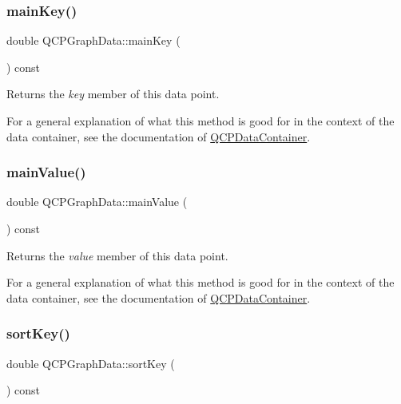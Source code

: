 \subsubsection{\texorpdfstring{main\+Key()}{mainKey()}}
{\footnotesize\ttfamily double Q\+C\+P\+Graph\+Data\+::main\+Key (\begin{DoxyParamCaption}{ }\end{DoxyParamCaption}) const\hspace{0.3cm}{\ttfamily [inline]}}

Returns the {\itshape key} member of this data point.

For a general explanation of what this method is good for in the context of the data container, see the documentation of \hyperlink{class_q_c_p_data_container}{Q\+C\+P\+Data\+Container}. \mbox{\label{class_q_c_p_graph_data_a1b1e440a430a4a83d9a3f6f247510f27}} 
\subsubsection{\texorpdfstring{main\+Value()}{mainValue()}}
{\footnotesize\ttfamily double Q\+C\+P\+Graph\+Data\+::main\+Value (\begin{DoxyParamCaption}{ }\end{DoxyParamCaption}) const\hspace{0.3cm}{\ttfamily [inline]}}

Returns the {\itshape value} member of this data point.

For a general explanation of what this method is good for in the context of the data container, see the documentation of \hyperlink{class_q_c_p_data_container}{Q\+C\+P\+Data\+Container}. \mbox{\label{class_q_c_p_graph_data_a5e0f37ea101eeec245d8c32a2206b204}} 
\subsubsection{\texorpdfstring{sort\+Key()}{sortKey()}}
{\footnotesize\ttfamily double Q\+C\+P\+Graph\+Data\+::sort\+Key (\begin{DoxyParamCaption}{ }\end{DoxyParamCaption}) const\hspace{0.3cm}{\ttfamily [inline]}}

